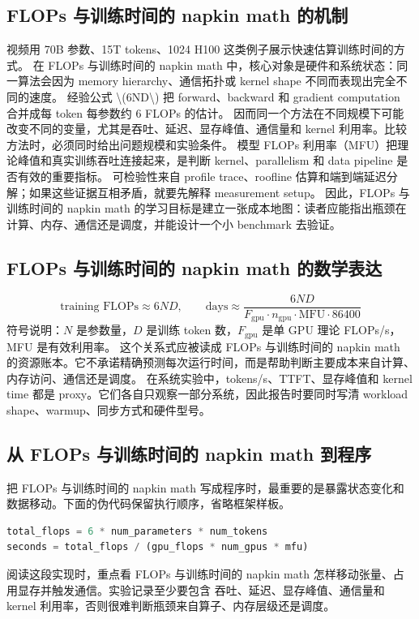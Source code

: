 \documentclass[a4paper]{article}
\begin{document}
\subsection{FLOPs 与训练时间的 napkin math 的机制}
视频用 70B 参数、15T tokens、1024 H100 这类例子展示快速估算训练时间的方式。 在 FLOPs 与训练时间的 napkin math 中，核心对象是硬件和系统状态：同一算法会因为 memory hierarchy、通信拓扑或 kernel shape 不同而表现出完全不同的速度。
经验公式 \textbackslash{}(6ND\textbackslash{}) 把 forward、backward 和 gradient computation 合并成每 token 每参数约 6 FLOPs 的估计。 因而同一个方法在不同规模下可能改变不同的变量，尤其是吞吐、延迟、显存峰值、通信量和 kernel 利用率。比较方法时，必须同时给出问题规模和实验条件。
模型 FLOPs 利用率（MFU）把理论峰值和真实训练吞吐连接起来，是判断 kernel、parallelism 和 data pipeline 是否有效的重要指标。 可检验性来自 profile trace、roofline 估算和端到端延迟分解；如果这些证据互相矛盾，就要先解释 measurement setup。
因此，FLOPs 与训练时间的 napkin math 的学习目标是建立一张成本地图：读者应能指出瓶颈在计算、内存、通信还是调度，并能设计一个小 benchmark 去验证。
\subsection{FLOPs 与训练时间的 napkin math 的数学表达}
\[\text{training FLOPs}\approx 6ND,\qquad \text{days}\approx \frac{6ND}{F_{\text{gpu}}\cdot n_{\text{gpu}}\cdot \text{MFU}\cdot 86400}\]
符号说明：\(N\) 是参数量，\(D\) 是训练 token 数，\(F_{\text{gpu}}\) 是单 GPU 理论 FLOPs/s，MFU 是有效利用率。
这个关系式应被读成 FLOPs 与训练时间的 napkin math 的资源账本。它不承诺精确预测每次运行时间，而是帮助判断主要成本来自计算、内存访问、通信还是调度。
在系统实验中，tokens/s、TTFT、显存峰值和 kernel time 都是 proxy。它们各自只观察一部分系统，因此报告时要同时写清 workload shape、warmup、同步方式和硬件型号。
\subsection{从 FLOPs 与训练时间的 napkin math 到程序}
把 FLOPs 与训练时间的 napkin math 写成程序时，最重要的是暴露状态变化和数据移动。下面的伪代码保留执行顺序，省略框架样板。
\begin{lstlisting}[language=Python]
total_flops = 6 * num_parameters * num_tokens
seconds = total_flops / (gpu_flops * num_gpus * mfu)
\end{lstlisting}
阅读这段实现时，重点看 FLOPs 与训练时间的 napkin math 怎样移动张量、占用显存并触发通信。实验记录至少要包含 吞吐、延迟、显存峰值、通信量和 kernel 利用率，否则很难判断瓶颈来自算子、内存层级还是调度。
\end{document}
